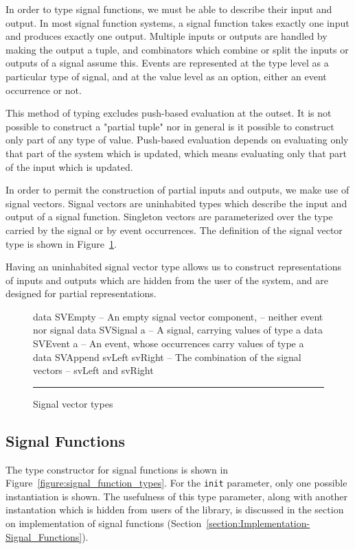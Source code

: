 In order to type signal functions, we must be able to describe their input and
output. In most signal function systems, a signal function takes exactly one
input and produces exactly one output. Multiple inputs or outputs are handled
by making the output a tuple, and combinators which combine or split the inputs
or outputs of a signal assume this. Events are represented at the type level
as a particular type of signal, and at the value level as an option, either an
event occurrence or not.

This method of typing excludes push-based evaluation at the outset.
It is not possible to construct a "partial tuple" nor in general is it possible
to construct only part of any type of value. Push-based evaluation depends on
evaluating only that part of the system which is updated, which means evaluating
only that part of the input which is updated.

In order to permit the construction of partial inputs and outputs, we make use
of signal vectors. Signal vectors are uninhabited types which describe the input
and output of a signal function. Singleton vectors are parameterized over the
type carried by the signal or by event occurrences. The definition of the signal
vector type is shown in Figure~\ref{figure:signal_vector_types}. 

Having an uninhabited signal vector type allows us to construct representations
of inputs and outputs which are hidden from the user of the system, and are
designed for partial representations.

\begin{figure}
\begin{code}
data SVEmpty    -- An empty signal vector component,
                -- neither event nor signal
data SVSignal a -- A signal, carrying values of type a
data SVEvent a  -- An event, whose occurrences carry values of type a
data SVAppend svLeft svRight -- The combination of the signal vectors
                             -- svLeft and svRight
\end{code}
\hrule
\caption{Signal vector types}
\label{figure:signal_vector_types}
\end{figure}

\subsection{Signal Functions}
\label{subsection:System_Design_and_Interface-Types-Signal_Functions}

The type constructor for signal functions is shown in
Figure~\ref{figure:signal_function_types}. For the {\tt init} parameter, only
one possible instantiation is shown. The usefulness of this type parameter,
along with another instantation which is hidden from users of the library,
is discussed in the section on implementation of signal functions
(Section~\ref{section:Implementation-Signal_Functions}).

